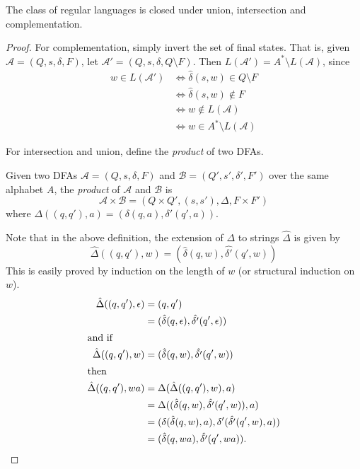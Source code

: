 \begin{theorem} \label{thm:dfa:regular:closure1}
    The class of regular languages is closed under union, intersection and
    complementation.
\end{theorem}
\begin{proof}
    For complementation, simply invert the set of final states.
    That is, given $\mathcal{A} = (Q, s, \delta, F)$, let
    $\mathcal{A}' = (Q, s, \delta, Q \setminus F)$.
    Then $L(\mathcal{A}') = A^* \setminus L(\mathcal{A})$, since
    \begin{align*}
        w \in L(\mathcal{A}') &\iff \hat{\delta}(s, w) \in Q \setminus F \\
        &\iff \hat{\delta}(s, w) \notin F \\
        &\iff w \notin L(\mathcal{A}) \\
        &\iff w \in A^* \setminus L(\mathcal{A})
    \end{align*}

    For intersection and union, define the \emph{product} of two DFAs.
    \begin{definition}[Product] \label{def:dfa:product}
        Given two DFAs $\mathcal{A} = (Q, s, \delta, F)$ and
        $\mathcal{B} = (Q', s', \delta', F')$ over the same alphabet $A$, the
        \emph{product} of $\mathcal{A}$ and $\mathcal{B}$ is \[
            \mathcal{A} \times \mathcal{B} = (Q \times Q', (s, s'), \Delta,
            F \times F')
        \] where $\Delta((q, q'), a) = (\delta(q, a), \delta'(q', a))$.
    \end{definition}
    Note that in the above definition, the extension of $\Delta$ to strings
    $\hat{\Delta}$ is given by \[
        \hat{\Delta}((q, q'), w) = (\hat{\delta}(q, w), \hat{\delta'}(q', w))
    \]
    This is easily proved by induction on the length of $w$ (or structural
    induction on $w$).
    \begin{align*}
        \hat{\Delta}((q, q'), \epsilon) &= (q, q') \\
        &= (\hat{\delta}(q, \epsilon), \hat{\delta'}(q', \epsilon)) \\
        \shortintertext{and if}
        \hat{\Delta}((q, q'), w) &= (\hat{\delta}(q, w), \hat{\delta'}(q', w)) \\
        \shortintertext{then}
        \hat{\Delta}((q, q'), wa) &= \Delta(\hat{\Delta}((q, q'), w), a) \\
        &= \Delta((\hat{\delta}(q, w), \hat{\delta'}(q', w)), a) \\
        &= (\delta(\hat{\delta}(q, w), a), \delta'(\hat{\delta'}(q', w), a)) \\
        &= (\hat{\delta}(q, wa), \hat{\delta'}(q', wa)).
    \end{align*}


\end{proof}
